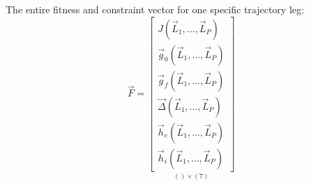 The entire fitness and constraint vector for one specific trajectory leg:
\begin{equation}
\vec{F} = 
\underset{() \times (7)}{
\begin{bmatrix}
J(\vec{L}_1, \dots, \vec{L}_P) \\
\vec{g}_{0}(\vec{L}_1, \dots, \vec{L}_P) \\
\vec{g}_{f}(\vec{L}_1, \dots, \vec{L}_P) \\
\vec{\Delta}(\vec{L}_1, \dots, \vec{L}_P) \\
\vec{h}_e(\vec{L}_1, \dots, \vec{L}_P) \\ 
\vec{h}_i(\vec{L}_1, \dots, \vec{L}_P)
\end{bmatrix}
}
\end{equation}










